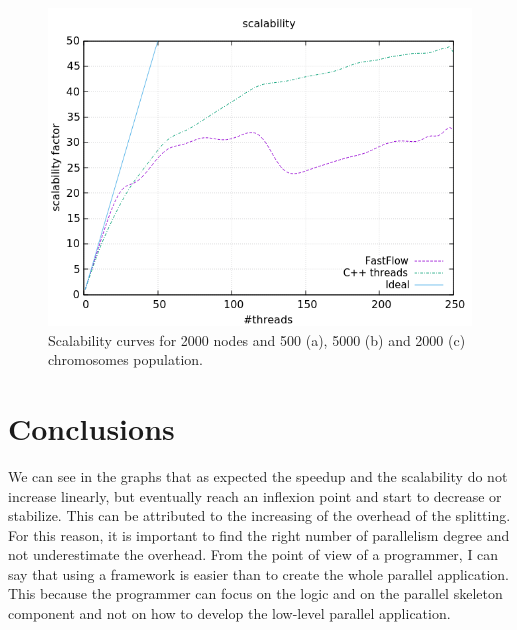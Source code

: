\documentclass[a4paper,10pt]{article}
\begin{document}
\begin{figure}[H]
			\begin{minipage}[t]{0.32\linewidth}
				\includegraphics[width=\linewidth]{BenchMarkTSP/scalability/2000/SC200020000_zoom.png}
				\subcaption{}
			\end{minipage}
			\caption{Scalability curves for 2000 nodes and 500 (a), 5000 (b) and 2000 (c) chromosomes population.}
			\label{2000s}
		\end{figure}



\section{Conclusions}
We can see in the graphs that as expected the speedup and the scalability do not increase linearly, but eventually reach an inflexion point and start to decrease or stabilize. This can be attributed to the increasing of the overhead of the splitting. For this reason, it is important to find the right number of parallelism degree and not underestimate the overhead. From the point of view of a programmer, I can say that using a framework is easier than to create the whole parallel application. This because the programmer can focus on the logic and on the parallel skeleton component and not on how to develop the low-level parallel application. 
\end{document}
